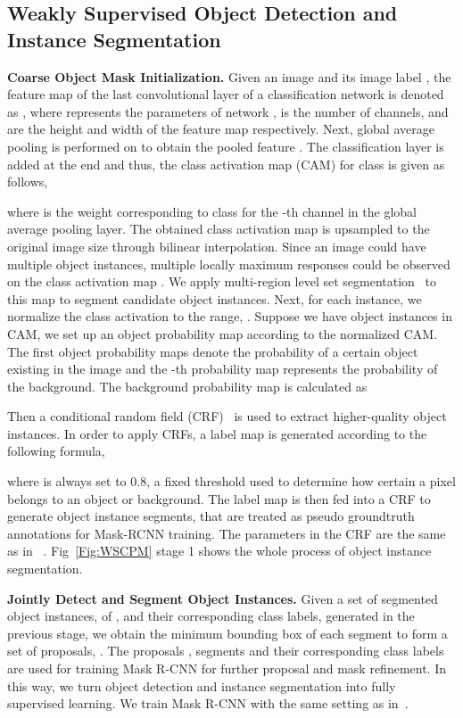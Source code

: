 \documentclass[10pt,twocolumn,letterpaper]{article}
\begin{document}
\subsection{Weakly Supervised Object Detection and Instance Segmentation}
\noindent\textbf{Coarse Object Mask Initialization.}
Given an image  and its image label , the feature map of the last convolutional layer of a classification network is denoted as , where  represents the parameters of network ,  is the number of channels,  and  are the height and width of the feature map respectively. Next, global average pooling is performed on  to obtain the pooled feature . The classification layer is added at the end and thus, the class activation map (CAM) for class  is given as follows,
    
where  is the weight corresponding to class  for the -th channel in the global average pooling layer. The obtained class activation map  is upsampled to the original image size  through bilinear interpolation. Since an image could have multiple object instances, multiple locally maximum responses could be observed on the class activation map . We apply multi-region level set segmentation~\cite{brox2006level} to this map to segment candidate object instances. Next, for each instance, we normalize the class activation to the range, . Suppose we have  object instances in CAM, we set up an object probability map  according to the normalized CAM. The first  object probability maps denote the probability of a certain object existing in the image and the -th probability map represents the probability of the background. The background probability map is calculated as
    

Then a conditional random field (CRF)~\cite{sutton2012introduction} is used to extract higher-quality object instances. In order to apply CRFs, a label map  is generated according to the following formula,
    
where  is always set to 0.8, a fixed threshold used to determine how certain a pixel belongs to an object or background. The label map  is then fed into a CRF to generate object instance segments, that are treated as pseudo groundtruth annotations for Mask-RCNN training. The parameters in the CRF are the same as in ~\cite{krahenbuhl2011efficient}. Fig~\ref{Fig:WSCPM} stage 1 shows the whole process of object instance segmentation.

\noindent\textbf{Jointly Detect and Segment Object Instances.} Given a set of segmented object instances,  of , and their corresponding class labels, generated in the previous stage, we obtain the minimum bounding box of each segment to form a set of proposals, . The proposals , segments  and their corresponding class labels are used for training Mask R-CNN for further proposal and mask refinement. In this way, we turn object detection and instance segmentation into fully supervised learning. We train Mask R-CNN with the same setting as in~\cite{he2017mask}.
\end{document}
